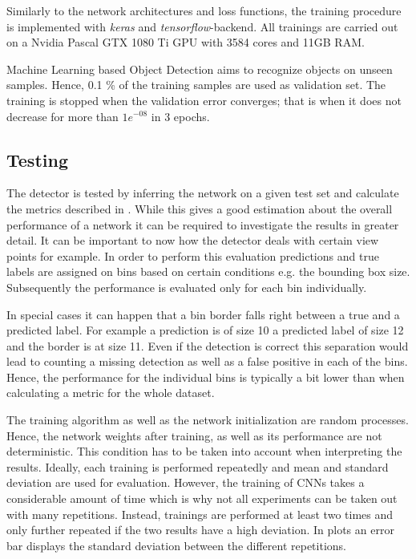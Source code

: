 Similarly to the network architectures and loss functions, the training procedure is implemented with \textit{keras} and \textit{tensorflow}-backend. All trainings are carried out on a Nvidia Pascal GTX 1080 Ti GPU with 3584 cores and 11GB RAM.

Machine Learning based Object Detection aims to recognize objects on unseen samples. Hence, 0.1 \% of the training samples are used as validation set. The training is stopped when the validation error converges; that is when it does not decrease for more than $1e^{-08}$ in 3 epochs.

\subsection{Testing}

The detector is tested by inferring the network on a given test set and calculate the metrics described in . While this gives a good estimation about the overall performance of a network it can be required to investigate the results in greater detail. It can be important to now how the detector deals with certain view points for example. In order to perform this evaluation predictions and true labels are assigned on bins based on certain conditions e.g. the bounding box size. Subsequently the performance is evaluated only for each bin individually.

In special cases it can happen that a bin border falls right between a true and a predicted label. For example a prediction is of size 10 a predicted label of size 12 and the border is at size 11. Even if the detection is correct this separation would lead to counting a missing detection as well as a false positive in each of the bins. Hence, the performance for the individual bins is typically a bit lower than when calculating a metric for the whole dataset.

The training algorithm as well as the network initialization are random processes. Hence, the network weights after training, as well as its performance are not deterministic. This condition has to be taken into account when interpreting the results. Ideally, each training is performed repeatedly and mean and standard deviation are used for evaluation. However, the training of \acp{CNN} takes a considerable amount of time which is why not all experiments can be taken out with many repetitions. Instead, trainings are performed at least two times and only further repeated if the two results have a high deviation. In plots an error bar displays the standard deviation between the different repetitions.

